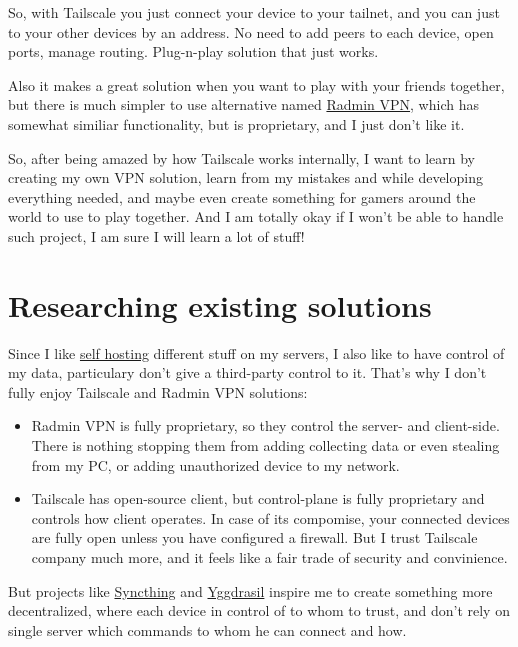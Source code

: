 \documentclass[a4paper]{article}
\begin{document}
So, with Tailscale you just connect your device to your tailnet, and you can just to your other devices by an address.
No need to add peers to each device, open ports, manage routing. Plug-n-play solution that just works.

Also it makes a great solution when you want to play with your friends together,
but there is much simpler to use alternative named \href{https://www.radmin-vpn.com/}{Radmin VPN},
which has somewhat similiar functionality, but is proprietary, and I just don't like it.

So, after being amazed by how Tailscale works internally, I want to learn by
creating my own VPN solution, learn from my mistakes and while developing everything needed,
and maybe even create something for gamers around the world to use to play together.
And I am totally okay if I won't be able to handle such project, I am sure I will learn a lot of stuff!

\newpage


\section{Researching existing solutions} \label{existingsolutions}

Since I like \href{https://en.wikipedia.org/wiki/Self-hosting_(network)}{self hosting}
different stuff on my servers, I also like to have control of my data,
particulary don't give a third-party control to it.
That's why I don't fully enjoy Tailscale and Radmin VPN solutions:
\begin{itemize}
  \item Radmin VPN is fully proprietary, so they control the server- and client-side.
        There is nothing stopping them from adding collecting data or even stealing from my PC,
        or adding unauthorized device to my network.
  \item Tailscale has open-source client, but control-plane is fully proprietary and controls
        how client operates. In case of its compomise, your connected devices are fully open
        unless you have configured a firewall. But I trust Tailscale company much more,
        and it feels like a fair trade of security and convinience.
\end{itemize}

But projects like \href{https://syncthing.net/}{Syncthing} and \href{https://yggdrasil-network.github.io/}{Yggdrasil}
inspire me to create something more decentralized, where each device in control of to whom to trust,
and don't rely on single server which commands to whom he can connect and how.
\end{document}
